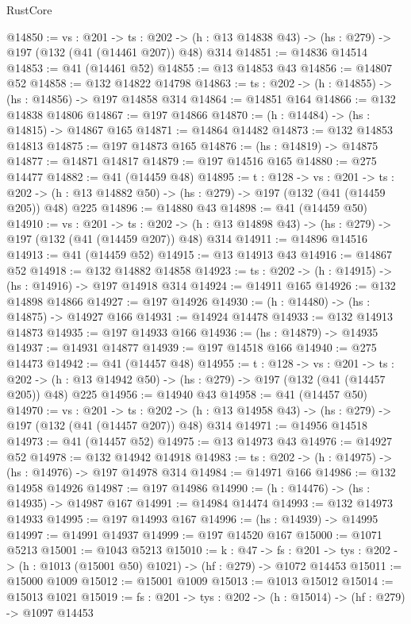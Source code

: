 \begin{lexlean}{RustCore}
\begin{coremodule}
@14850 := {vs : @201} ->
  {ts : @202} -> (h : @13 @14838 @43) -> (hs : @279) -> @197 (@132 (@41 (@14461 @207)) @48) @314
@14851 := @14836 @14514
@14853 := @41 (@14461 @52)
@14855 := @13 @14853 @43
@14856 := @14807 @52
@14858 := @132 @14822 @14798
@14863 := {ts : @202} -> (h : @14855) -> (hs : @14856) -> @197 @14858 @314
@14864 := @14851 @164
@14866 := @132 @14838 @14806
@14867 := @197 @14866
@14870 := (h : @14484) -> (hs : @14815) -> @14867 @165
@14871 := @14864 @14482
@14873 := @132 @14853 @14813
@14875 := @197 @14873 @165
@14876 := (hs : @14819) -> @14875
@14877 := @14871 @14817
@14879 := @197 @14516 @165
@14880 := @275 @14477
@14882 := @41 (@14459 @48)
@14895 := {t : @128} ->
  {vs : @201} ->
  {ts : @202} -> (h : @13 @14882 @50) -> (hs : @279) -> @197 (@132 (@41 (@14459 @205)) @48) @225
@14896 := @14880 @43
@14898 := @41 (@14459 @50)
@14910 := {vs : @201} ->
  {ts : @202} -> (h : @13 @14898 @43) -> (hs : @279) -> @197 (@132 (@41 (@14459 @207)) @48) @314
@14911 := @14896 @14516
@14913 := @41 (@14459 @52)
@14915 := @13 @14913 @43
@14916 := @14867 @52
@14918 := @132 @14882 @14858
@14923 := {ts : @202} -> (h : @14915) -> (hs : @14916) -> @197 @14918 @314
@14924 := @14911 @165
@14926 := @132 @14898 @14866
@14927 := @197 @14926
@14930 := (h : @14480) -> (hs : @14875) -> @14927 @166
@14931 := @14924 @14478
@14933 := @132 @14913 @14873
@14935 := @197 @14933 @166
@14936 := (hs : @14879) -> @14935
@14937 := @14931 @14877
@14939 := @197 @14518 @166
@14940 := @275 @14473
@14942 := @41 (@14457 @48)
@14955 := {t : @128} ->
  {vs : @201} ->
  {ts : @202} -> (h : @13 @14942 @50) -> (hs : @279) -> @197 (@132 (@41 (@14457 @205)) @48) @225
@14956 := @14940 @43
@14958 := @41 (@14457 @50)
@14970 := {vs : @201} ->
  {ts : @202} -> (h : @13 @14958 @43) -> (hs : @279) -> @197 (@132 (@41 (@14457 @207)) @48) @314
@14971 := @14956 @14518
@14973 := @41 (@14457 @52)
@14975 := @13 @14973 @43
@14976 := @14927 @52
@14978 := @132 @14942 @14918
@14983 := {ts : @202} -> (h : @14975) -> (hs : @14976) -> @197 @14978 @314
@14984 := @14971 @166
@14986 := @132 @14958 @14926
@14987 := @197 @14986
@14990 := (h : @14476) -> (hs : @14935) -> @14987 @167
@14991 := @14984 @14474
@14993 := @132 @14973 @14933
@14995 := @197 @14993 @167
@14996 := (hs : @14939) -> @14995
@14997 := @14991 @14937
@14999 := @197 @14520 @167
@15000 := @1071 @5213
@15001 := @1043 @5213
@15010 := {k : @47} ->
  {fs : @201} -> {tys : @202} -> (h : @1013 (@15001 @50) @1021) -> (hf : @279) -> @1072 @14453
@15011 := @15000 @1009
@15012 := @15001 @1009
@15013 := @1013 @15012
@15014 := @15013 @1021
@15019 := {fs : @201} -> {tys : @202} -> (h : @15014) -> (hf : @279) -> @1097 @14453

\end{coremodule}
\end{lexlean}
